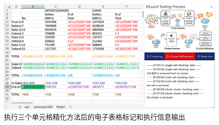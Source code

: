\begin{figure}[tbp]    
    \centering
    \includegraphics[width=\textwidth]{figure/eg/eguard-3.png}
    \caption{\eg 执行三个单元格精化方法后的电子表格标记和执行信息输出}
    \label{figure-eg3}
\end{figure}